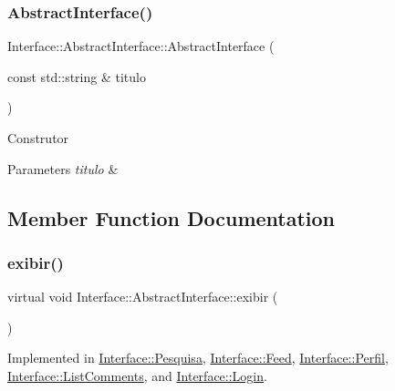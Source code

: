 \subsubsection{\texorpdfstring{Abstract\+Interface()}{AbstractInterface()}}
{\footnotesize\ttfamily Interface\+::\+Abstract\+Interface\+::\+Abstract\+Interface (\begin{DoxyParamCaption}\item[{const std\+::string \&}]{titulo }\end{DoxyParamCaption})\hspace{0.3cm}{\ttfamily [explicit]}}

Construtor 
\begin{DoxyParams}{Parameters}
{\em titulo} & \\
\hline
\end{DoxyParams}


\subsection{Member Function Documentation}
\mbox{\label{class_interface_1_1_abstract_interface_af1a45726ea636cdbf1cf2d7daa5708be}} 
\subsubsection{\texorpdfstring{exibir()}{exibir()}}
{\footnotesize\ttfamily virtual void Interface\+::\+Abstract\+Interface\+::exibir (\begin{DoxyParamCaption}{ }\end{DoxyParamCaption})\hspace{0.3cm}{\ttfamily [pure virtual]}}



Implemented in \hyperlink{class_interface_1_1_pesquisa_a4d89df37dbf36d20f07c2dd00a6b97f3}{Interface\+::\+Pesquisa}, \hyperlink{class_interface_1_1_feed_a8ba454c1afcb942a84bfd9d918cf262c}{Interface\+::\+Feed}, \hyperlink{class_interface_1_1_perfil_a29d31d3c2daa82a7b67a24f061b4547c}{Interface\+::\+Perfil}, \hyperlink{class_interface_1_1_list_comments_a86ebab6e64dc979fd0f21bbeb142ec55}{Interface\+::\+List\+Comments}, and \hyperlink{class_interface_1_1_login_a5db83876c6d264c4b61121e0e0b9ca38}{Interface\+::\+Login}.

